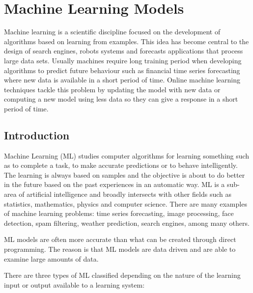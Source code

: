 \chapter{Machine Learning Models}
Machine learning is a scientific discipline focused on the development of algorithms based on learning from examples. This idea has become central to the design of search engines, robots systems and forecasts applications that process large data sets. Usually machines require long training period when developing algorithms to predict future behaviour such as financial time series forecasting where new data is available in a short period of time. Online machine learning techniques tackle this problem by updating the model with new data or computing a new model using less data so they  can give a response in a short period of time.

\vspace{0.5cm} 

\section{Introduction}
Machine Learning (ML) studies computer algorithms for learning
something such as to complete a task, to make accurate predictions or to behave intelligently. The learning is always based on samples and the objective is about to do better in the future based on the past experiences in an automatic way. ML is a sub-area of artificial intelligence and broadly intersects with other fields such as statistics, mathematics, physics and computer science. 
There are many examples of machine learning problems: time series forecasting, image processing, face detection, spam filtering, weather prediction, search engines, among many others.

ML models are often more accurate than what can be created through direct programming. The reason is that ML models are data driven and are able to examine large amounts of data.

There are three types of ML classified depending on the nature of the learning input or output available to a learning system:

